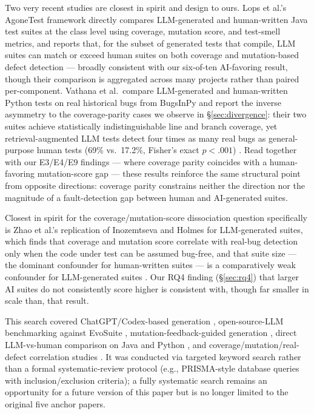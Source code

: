 \documentclass[10pt,conference]{IEEEtran}
\begin{document}
Two very recent studies are closest in spirit and design to ours. Lops et al.'s AgoneTest framework directly compares LLM-generated and human-written Java test suites at the class level using coverage, mutation score, and test-smell metrics, and reports that, for the subset of generated tests that compile, LLM suites can match or exceed human suites on both coverage and mutation-based defect detection \cite{lops2025agonetest} — broadly consistent with our six-of-ten AI-favoring result, though their comparison is aggregated across many projects rather than paired per-component. Vathana et al.\ compare LLM-generated and human-written Python tests on real historical bugs from BugsInPy and report the inverse asymmetry to the coverage-parity cases we observe in \S\ref{sec:divergence}: their two suites achieve statistically indistinguishable line and branch coverage, yet retrieval-augmented LLM tests detect four times as many real bugs as general-purpose human tests (69\% vs.\ 17.2\%, Fisher's exact $p<.001$) \cite{vathana2026}. Read together with our E3/E4/E9 findings — where coverage parity coincides with a human-favoring mutation-score gap — these results reinforce the same structural point from opposite directions: coverage parity constrains neither the direction nor the magnitude of a fault-detection gap between human and AI-generated suites.

Closest in spirit for the coverage/mutation-score dissociation question specifically is Zhao et al.'s replication of Inozemtseva and Holmes for LLM-generated suites, which finds that coverage and mutation score correlate with real-bug detection only when the code under test can be assumed bug-free, and that suite size — the dominant confounder for human-written suites — is a comparatively weak confounder for LLM-generated suites \cite{zhao2026}. Our RQ4 finding (\S\ref{sec:rq4}) that larger AI suites do not consistently score higher is consistent with, though far smaller in scale than, that result.

This search covered ChatGPT/Codex-based generation \cite{yuan2023}, open-source-LLM benchmarking against EvoSuite \cite{yang2024ase,ouedraogo2024}, mutation-feedback-guided generation \cite{mutap2024,mutgen2026}, direct LLM-vs-human comparison on Java \cite{lops2025agonetest} and Python \cite{vathana2026}, and coverage/mutation/real-defect correlation studies \cite{inozemtseva2014,papadakis2019survey,zhao2026}. It was conducted via targeted keyword search rather than a formal systematic-review protocol (e.g., PRISMA-style database queries with inclusion/exclusion criteria); a fully systematic search remains an opportunity for a future version of this paper but is no longer limited to the original five anchor papers.
\end{document}
